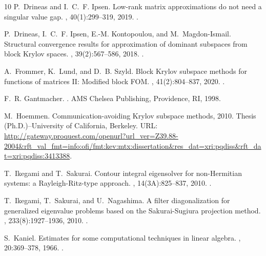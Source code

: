 \documentclass{article}
\begin{document}
\begin{thebibliography}{10}
P.~Drineas and I.~C.~F. Ipsen.
\newblock Low-rank matrix approximations do not need a singular value gap.
, 40(1):299--319, 2019.
\newblock \href {https://doi.org/10.1137/18M1163658}
  {}.

P.~Drineas, I.~C.~F. Ipsen, E.-M. Kontopoulou, and M.~Magdon-Ismail.
\newblock Structural convergence results for approximation of dominant
  subspaces from block {K}rylov spaces.
, 39(2):567--586, 2018.
\newblock \href {https://doi.org/10.1137/16M1091745}
  {}.

A.~Frommer, K.~Lund, and D.~B. Szyld.
\newblock Block {K}rylov subspace methods for functions of matrices {II}:
  {M}odified block {FOM}.
, 41(2):804--837, 2020.
\newblock \href {https://doi.org/10.1137/19M1255847}
  {}.

F.~R. Gantmacher.
.
\newblock AMS Chelsea Publishing, Providence, RI, 1998.

M.~Hoemmen.
\newblock Communication-avoiding {K}rylov subspace methods, 2010.
\newblock Thesis (Ph.D.)--University of California, Berkeley.
\newblock URL:
  \url{http://gateway.proquest.com/openurl?url_ver=Z39.88-2004&rft_val_fmt=info:ofi/fmt:kev:mtx:dissertation&res_dat=xri:pqdiss&rft_dat=xri:pqdiss:3413388}.

T.~Ikegami and T.~Sakurai.
\newblock Contour integral eigensolver for non-{H}ermitian systems: a
  {R}ayleigh-{R}itz-type approach.
, 14(3A):825--837, 2010.
\newblock \href {https://doi.org/10.11650/twjm/1500405869}
  {}.

T.~Ikegami, T.~Sakurai, and U.~Nagashima.
\newblock A filter diagonalization for generalized eigenvalue problems based on
  the {S}akurai-{S}ugiura projection method.
, 233(8):1927--1936, 2010.
\newblock \href {https://doi.org/10.1016/j.cam.2009.09.029}
  {}.

S.~Kaniel.
\newblock Estimates for some computational techniques in linear algebra.
, 20:369--378, 1966.
\newblock \href {https://doi.org/10.2307/2003590} {}.


\end{thebibliography}
\end{document}
